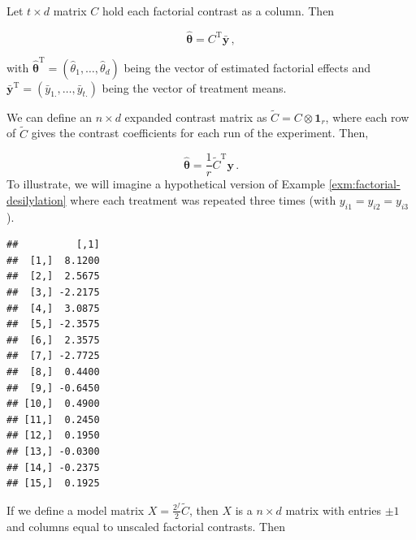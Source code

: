 \documentclass[
]{book}
\newenvironment{Shaded}{\begin{snugshade}}{\end{snugshade}}
\newcommand{\CommentTok}[1]{\textcolor[rgb]{0.56,0.35,0.01}{\textit{#1}}}
\newcommand{\DecValTok}[1]{\textcolor[rgb]{0.00,0.00,0.81}{#1}}
\newcommand{\FunctionTok}[1]{\textcolor[rgb]{0.00,0.00,0.00}{#1}}
\newcommand{\NormalTok}[1]{#1}
\newcommand{\OtherTok}[1]{\textcolor[rgb]{0.56,0.35,0.01}{#1}}
\newcommand{\SpecialCharTok}[1]{\textcolor[rgb]{0.00,0.00,0.00}{#1}}
\theoremstyle{definition}
\theoremstyle{definition}
\theoremstyle{definition}
\theoremstyle{definition}
\theoremstyle{remark}
\begin{document}
Let \(t\times d\) matrix \(C\) hold each factorial contrast as a column. Then

\[
\hat{\boldsymbol{\theta}} = C^{\mathrm{T}}\bar{\boldsymbol{y}}\,,
\]

with \(\hat{\boldsymbol{\theta}}^{\mathrm{T}} = (\hat{\theta}_1, \ldots, \hat{\theta}_d)\) being the vector of estimated factorial effects and \(\bar{\boldsymbol{y}}^{\mathrm{T}} = (\bar{y}_{1.}, \ldots, \bar{y}_{t.})\) being the vector of treatment means.

We can define an \(n\times d\) expanded contrast matrix as \(\tilde{C} = C \otimes \boldsymbol{1}_r\), where each row of \(\tilde{C}\) gives the contrast coefficients for each run of the experiment. Then,

\[
\hat{\boldsymbol{\theta}} = \frac{1}{r}\tilde{C}^{\mathrm{T}}\boldsymbol{y}\,.
\]
To illustrate, we will imagine a hypothetical version of Example \ref{exm:factorial-desilylation} where each treatment was repeated three times (with \(y_{i1} = y_{i2} = y_{i3}\)).

\begin{Shaded}
\end{Shaded}

\begin{verbatim}
##          [,1]
##  [1,]  8.1200
##  [2,]  2.5675
##  [3,] -2.2175
##  [4,]  3.0875
##  [5,] -2.3575
##  [6,]  2.3575
##  [7,] -2.7725
##  [8,]  0.4400
##  [9,] -0.6450
## [10,]  0.4900
## [11,]  0.2450
## [12,]  0.1950
## [13,] -0.0300
## [14,] -0.2375
## [15,]  0.1925
\end{verbatim}

If we define a model matrix \(X = \frac{2^{f}}{2}\tilde{C}\), then \(X\) is a \(n\times d\) matrix with entries \(\pm 1\) and columns equal to unscaled factorial contrasts. Then
\end{document}
